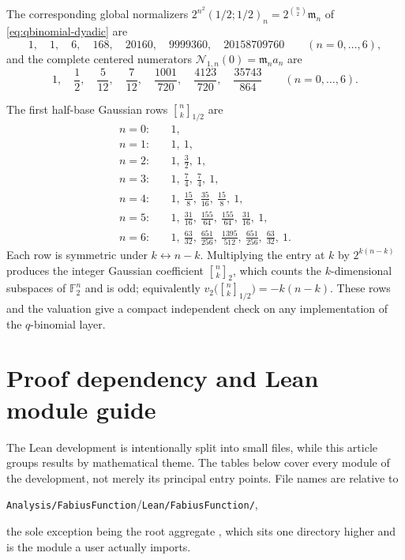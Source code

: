 \documentclass[11pt,oneside]{article}
\theoremstyle{definition}
\theoremstyle{remark}
\newcommand{\vtwo}{v_2}
\newcommand{\qbinom}[3]{\genfrac{[}{]}{0pt}{}{#1}{#2}_{#3}}
\newcommand{\repo}{\nolinkurl{Analysis/FabiusFunction}}
\begin{document}
The corresponding global normalizers $2^{n^2}(1/2;1/2)_n=2^{\binom n2}\mathfrak m_n$ of
\eqref{eq:qbinomial-dyadic} are
\begin{equation*}
 1,\quad1,\quad6,\quad168,\quad20160,\quad9999360,\quad20158709760
 \qquad(n=0,\ldots,6),
\end{equation*}
and the complete centered numerators $\mathcal N_{1,n}(0)=\mathfrak m_na_n$ are
\begin{equation*}
 1,\quad\frac12,\quad\frac5{12},\quad\frac7{12},\quad\frac{1001}{720},
 \quad\frac{4123}{720},\quad\frac{35743}{864}
 \qquad(n=0,\ldots,6).
\end{equation*}

The first half-base Gaussian rows $\qbinom nk{1/2}$ are
\begin{align*}
 n=0:&\quad 1,\\
 n=1:&\quad 1,\ 1,\\
 n=2:&\quad 1,\ \frac32,\ 1,\\
 n=3:&\quad 1,\ \frac74,\ \frac74,\ 1,\\
 n=4:&\quad 1,\ \frac{15}8,\ \frac{35}{16},\ \frac{15}8,\ 1,\\
 n=5:&\quad 1,\ \frac{31}{16},\ \frac{155}{64},\ \frac{155}{64},\ \frac{31}{16},\ 1,\\
 n=6:&\quad 1,\ \frac{63}{32},\ \frac{651}{256},\ \frac{1395}{512},\ \frac{651}{256},
      \ \frac{63}{32},\ 1.
\end{align*}
Each row is symmetric under $k\leftrightarrow n-k$.  Multiplying the entry at $k$ by
$2^{k(n-k)}$ produces the integer Gaussian coefficient $\qbinom nk2$, which counts the
$k$-dimensional subspaces of $\mathbb F_2^n$ and is odd; equivalently
$\vtwo\bigl(\qbinom nk{1/2}\bigr)=-k(n-k)$.  These rows and the valuation give a compact
independent check on any implementation of the $q$-binomial layer.

\section{Proof dependency and Lean module guide}
\label{app:module-guide}

The Lean development is intentionally split into small files, while this article groups
results by mathematical theme.  The tables below cover every module of the development, not
merely its principal entry points.  File names are relative to
\begin{center}
\repo/\texttt{Lean/FabiusFunction/},
\end{center}
the sole exception being the root aggregate , which sits one
directory higher and is the module a user actually imports.
\end{document}
